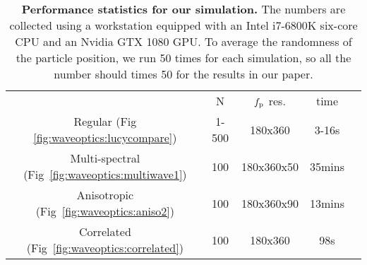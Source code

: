 \begin{table}[h]
	\centering
    \caption[Performance statistics for our simulation]{\label{fig:waveoptics:time}
        \textbf{Performance statistics for our simulation.}
		The numbers are collected using a workstation equipped with an Intel i7-6800K six-core CPU and an Nvidia GTX 1080 GPU.
		To average the randomness of the particle position, we run 50 times for each simulation, so all the number should times 50 for the results in our paper.
    }
    \begin{tabular}{ccccc}
    \hline
                                                    & N     & $f_\mathrm{p}$ res.    & time   \\
    Regular (Fig \ref{fig:waveoptics:lucycompare})             & 1-500 &  180x360         & 3-16s  \\
    Multi-spectral (Fig~\ref{fig:waveoptics:multiwave1})       & 100   &  180x360x50      & 35mins \\
    Anisotropic (Fig~\ref{fig:waveoptics:aniso2})              & 100   &  180x360x90      & 13mins \\
    Correlated (Fig~\ref{fig:waveoptics:correlated})           & 100   &  180x360         & 98s    \\
    \hline
    \end{tabular}
\end{table}
